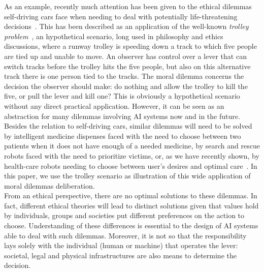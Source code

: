 \documentclass[twocolumn]{article}
\begin{document}
As an example, recently much attention has been given to the ethical dilemmas self-driving cars face when needing to deal with potentially life-threatening decisions~\cite{Bonnefon1573}. This has been described as an application of the well-known \textit{trolley problem}~\cite{foot1967problem}, an hypothetical scenario, long used in philosophy and ethics discussions, where a runway trolley is speeding down a track to which five people are tied up and unable to move. An observer has control over a lever that can switch tracks before the trolley hits the five people, but also on this alternative track there is one person tied to the tracks. The moral dilemma concerns the decision the observer should make: do nothing and allow the trolley to kill the five, or pull the lever and kill one? This is obviously a hypothetical scenario without any direct practical application. However, it can be seen as an abstraction for many dilemmas involving AI systems now and in the future. Besides the relation to self-driving cars, similar dilemmas will need to be solved by intelligent medicine dispenses faced with the need to choose between two patients when it does not have enough of a needed medicine, by search and rescue robots faced with the need to prioritize victims, or, as we have recently shown, by health-care robots needing to choose between user's desires and optimal care~\cite{pizza2017icai}. In this paper, we use the trolley scenario as illustration of this wide application of moral dilemmas deliberation.\\
From an ethical perspective, there are no optimal solutions to these dilemmas. In fact, different ethical theories will lead to distinct solutions given that values hold by individuals, groups and societies put different preferences on the action to choose. Understanding of these differences is essential to the design of AI systems able to deal with such dilemmas. Moreover, it is not so that the responsibility lays solely with the individual (human or machine) that operates the lever: societal, legal and physical infrastructures are also means to determine the decision.
\end{document}
